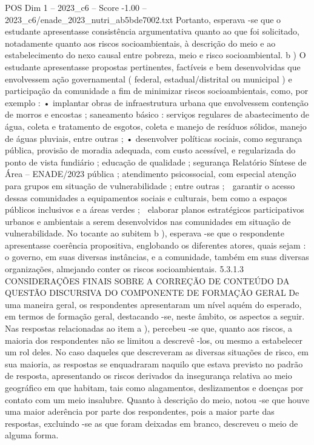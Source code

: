 \begin{textsample}{POS Dim 1 – 2023\_c6 – Score -1.00 – 2023\_c6/enade\_2023\_nutri\_ab5bde7002.txt}
Portanto, esperava -se que o estudante apresentasse consistência argumentativa quanto ao que foi solicitado, notadamente quanto aos riscos socioambientais, à descrição do meio e ao estabelecimento do nexo causal entre pobreza, meio e risco socioambiental. b ) O estudante apresentasse propostas pertinentes, factíveis e bem desenvolvidas que envolvessem ação governamental ( federal, estadual/distrital ou municipal ) e participação da comunidade a fim de minimizar riscos socioambientais, como, por exemplo : • implantar obras de infraestrutura urbana que envolvessem contenção de morros e encostas ; saneamento básico : serviços regulares de abastecimento de água, coleta e tratamento de esgotos, coleta e manejo de resíduos sólidos, manejo de águas pluviais, entre outras ; • desenvolver políticas sociais, como segurança pública, provisão de moradia adequada, com custo acessível, e regularizada do ponto de vista fundiário ; educação de qualidade ; segurança Relatório Síntese de Área – ENADE/2023 pública ; atendimento psicossocial, com especial atenção para grupos em situação de vulnerabilidade ; entre outras ;  garantir o acesso dessas comunidades a equipamentos sociais e culturais, bem como a espaços públicos inclusivos e a áreas verdes ;  elaborar planos estratégicos participativos urbanos e ambientais a serem desenvolvidos nas comunidades em situação de vulnerabilidade.
No tocante ao subitem b ), esperava -se que o respondente apresentasse coerência propositiva, englobando os diferentes atores, quais sejam : o governo, em suas diversas instâncias, e a comunidade, também em suas diversas organizações, almejando conter os riscos socioambientais. 5.3.1.3 CONSIDERAÇÕES FINAIS SOBRE A CORREÇÃO DE CONTEÚDO DA QUESTÃO DISCURSIVA DO COMPONENTE DE FORMAÇÃO GERAL De uma maneira geral, os respondentes apresentaram um nível aquém do esperado, em termos de formação geral, destacando -se, neste âmbito, os aspectos a seguir.
Nas respostas relacionadas ao item a ), percebeu -se que, quanto aos riscos, a maioria dos respondentes não se limitou a descrevê -los, ou mesmo a estabelecer um rol deles.
No caso daqueles que descreveram as diversas situações de risco, em sua maioria, as respostas se enquadraram naquilo que estava previsto no padrão de resposta, apresentando os riscos derivados da insegurança relativa ao meio geográfico em que habitam, tais como alagamentos, deslizamentos e doenças por contato com um meio insalubre.
Quanto à descrição do meio, notou -se que houve uma maior aderência por parte dos respondentes, pois a maior parte das respostas, excluindo -se as que foram deixadas em branco, descreveu o meio de alguma forma.

\end{textsample}
